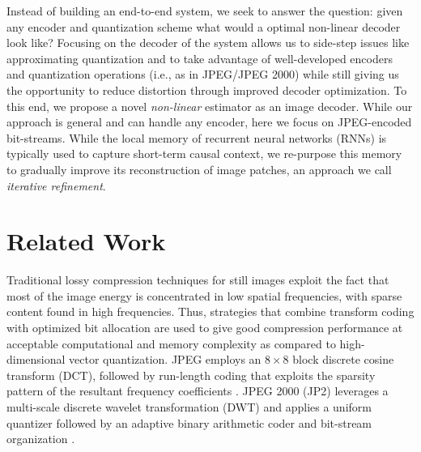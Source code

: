 \documentclass[smallabstract,smallcaptions]{dccpaper}
\begin{document}
Instead of building an end-to-end system, we seek to answer the question: given any encoder and quantization scheme what would a optimal non-linear decoder look like? Focusing on the decoder of the system allows us to side-step issues like approximating quantization and to take advantage of well-developed encoders and quantization operations (i.e., as in JPEG/JPEG 2000) while still giving us the opportunity to reduce distortion through improved decoder optimization.
To this end, we propose a novel \emph{non-linear} estimator as an image decoder. While our approach is general and can handle any encoder, here we focus on JPEG-encoded bit-streams.
While the local memory of recurrent neural networks (RNNs) is typically used to capture short-term causal context, we re-purpose this memory to gradually improve its reconstruction of image patches, an approach we call \emph{iterative refinement}.

\section{Related Work}
\label{related_work}
Traditional lossy compression techniques for still images exploit the fact that most of the image energy is concentrated in low spatial frequencies, with sparse content found in high frequencies. Thus, strategies that combine transform coding with optimized bit allocation are used to give good compression performance at acceptable computational and memory complexity as compared to high-dimensional vector quantization. JPEG employs an $8\times8$ block discrete cosine transform (DCT), followed by run-length coding that exploits the sparsity pattern of the resultant frequency coefficients \cite{wallace1991jpegstandard}. %
JPEG 2000 (JP2) leverages a multi-scale discrete wavelet transformation (DWT) and applies a uniform quantizer followed by an adaptive binary arithmetic coder and bit-stream organization \cite{rabbani2002jpeg2000}. %
\end{document}
